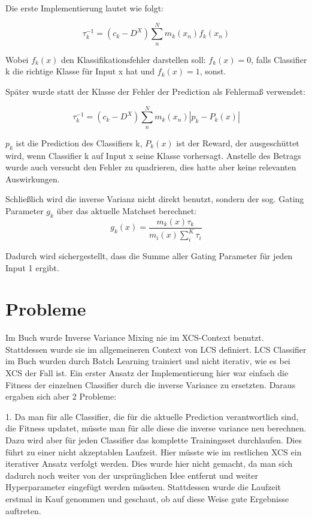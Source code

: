 \documentclass{ocsmnar}
\begin{document}
Die erste Implementierung lautet wie folgt: 

$$ \tau_{k}^{-1} = (c_{k} - D^{X}) \sum_{n}^{N} m_{k}(x_{n})f_{k}(x_{n}) $$

Wobei $f_{k}(x)$ den Klassifikationsfehler darstellen soll: $f_{k}(x) = 0$, falls Classifier k die richtige Klasse für Input x hat und $f_{k}(x) = 1$, sonst. 

Später wurde statt der Klasse der Fehler der Prediction als Fehlermaß verwendet:

$$ \tau_{k}^{-1} = (c_{k} - D^{X}) \sum_{n}^{N} m_{k}(x_{n}) |p_{k} - P_{k}(x)|  $$

$p_{k}$ ist die Prediction des Classifiers k, $P_{k}(x)$ ist der Reward, der ausgeschüttet wird, wenn Classifier k auf Input x seine Klasse vorhersagt. 
Anstelle des Betrags wurde auch versucht den Fehler zu quadrieren, dies hatte aber keine relevanten Auswirkungen.

Schließlich wird die inverse Varianz nicht direkt benutzt, sondern  der sog. Gating Parameter $g_{k}$ über das aktuelle Matchset berechnet: 
$$ g_k(x) = \frac{m_k(x)\tau_k}{m_i(x)\sum_i^K \tau_i}$$

Dadurch wird sichergestellt, dass die Summe aller Gating Parameter für jeden Input 1 ergibt. 




\section{Probleme}
Im Buch wurde Inverse Variance Mixing nie im XCS-Context benutzt. Stattdessen wurde sie im allgemeineren Context von LCS definiert. LCS Classifier im Buch wurden durch Batch Learning trainiert und nicht iterativ, wie es bei XCS der Fall ist. 
Ein erster Ansatz der Implementierung hier war einfach die Fitness der einzelnen Classifier durch die inverse Variance zu ersetzten. 
Daraus ergaben sich aber 2 Probleme: 

1. Da man für alle Classifier, die für die aktuelle Prediction verantwortlich sind, die Fitness updatet, müsste man für alle diese die inverse variance neu berechnen. Dazu wird aber für jeden Classifier das komplette Trainingsset durchlaufen. Dies führt zu einer nicht akzeptablen Laufzeit. Hier müsste wie im restlichen XCS ein iterativer Ansatz verfolgt werden. Dies wurde hier nicht gemacht, da man sich dadurch noch weiter von der ursprünglichen Idee entfernt und weiter Hyperparameter eingefügt werden müssten. 
Stattdessen wurde die Laufzeit erstmal in Kauf genommen und geschaut, ob auf diese Weise gute Ergebnisse auftreten.  
\end{document}

